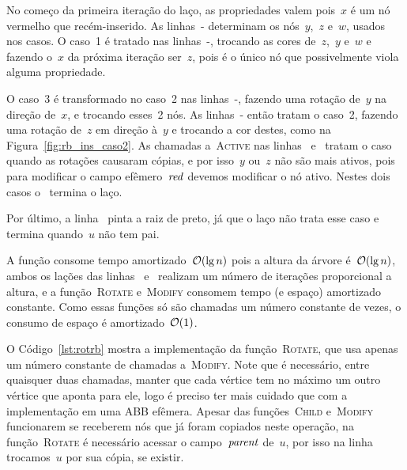 \documentclass[../../main.tex]{subfiles}
\begin{document}
No começo da primeira iteração do laço, as propriedades valem pois~$x$ é um nó vermelho que recém-inserido. As linhas~- determinam os nós~$y$,~$z$ e~$w$, usados nos casos. O caso~1 é tratado nas linhas~-, trocando as cores de~$z$,~$y$ e~$w$ e fazendo o~$x$ da próxima iteração ser~$z$, pois é o único nó que possivelmente viola alguma propriedade.

O caso~3 é transformado no caso~2 nas linhas~-, fazendo uma rotação de~$y$ na direção de~$x$, e trocando esses~2 nós. As linhas~- então tratam o caso~2, fazendo uma rotação de~$z$ em direção à~$y$ e trocando a cor destes, como na Figura~\ref{fig:rb_ins_caso2}. As chamadas a~\textsc{Active} nas linhas~ e~ tratam o caso quando as rotações causaram cópias, e por isso~$y$ ou~$z$ não são mais ativos, pois para modificar o campo efêmero~$\mathit{red}$ devemos modificar o nó ativo. Nestes dois casos o~ termina o laço.

Por último, a linha~ pinta a raiz de preto, já que o laço não trata esse caso e termina quando~$u$ não tem pai.

A função consome tempo amortizado~$\mathcal{O}(\lg n)$ pois a altura da árvore é~$\mathcal{O}(\lg n)$, ambos os lações das linhas~ e~ realizam um número de iterações proporcional a altura, e a função~\textsc{Rotate} e~\textsc{Modify} consomem tempo (e espaço) amortizado constante. Como essas funções só são chamadas um número constante de vezes, o consumo de espaço é amortizado~$\mathcal{O}(1)$.

O Código~\ref{lst:rotrb} mostra a implementação da função~\textsc{Rotate}, que usa apenas um número constante de chamadas a~\textsc{Modify}. Note que é necessário, entre quaisquer duas chamadas, manter que cada vértice tem no máximo um outro vértice que aponta para ele, logo é preciso ter mais cuidado que com a implementação em uma ABB efêmera. Apesar das funções~\textsc{Child} e~\textsc{Modify} funcionarem se receberem nós que já foram copiados neste operação, na função~\textsc{Rotate} é necessário acessar o campo~$\mathit{parent}$ de~$u$, por isso na linha~ trocamos~$u$ por sua cópia, se existir.
\end{document}
